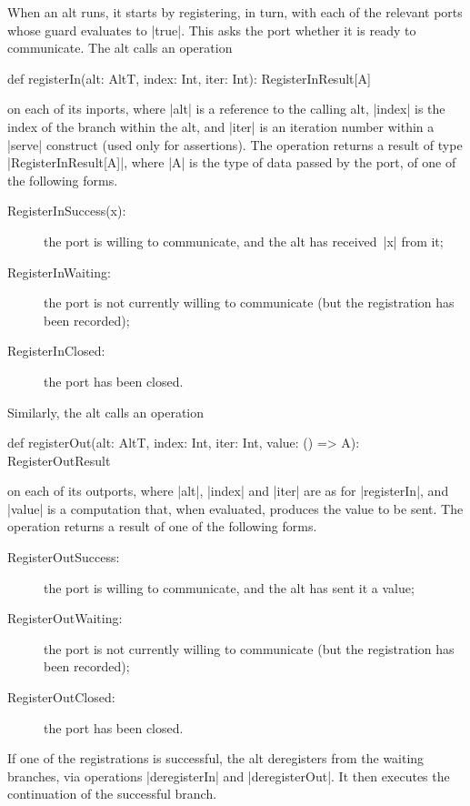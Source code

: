When an alt runs, it starts by registering, in turn, with each of the relevant
ports whose guard evaluates to |true|.  This asks the port whether it is ready
to communicate.  The alt calls an operation
%
\begin{scala}
def registerIn(alt: AltT, index: Int, iter: Int): RegisterInResult[A]  
\end{scala}
%
on each of its inports, where |alt| is a reference to the calling alt, |index|
is the index of the branch within the alt, and |iter| is an iteration number
within a |serve| construct (used only for assertions).  The operation returns a
result of type |RegisterInResult[A]|, where |A| is the type of data passed by
the port, of one of the following forms.
%
\begin{description}
\item[\rm{\scalastyle RegisterInSuccess(x)}:] the port is willing to
  communicate, and the alt has received~|x| from it;

\item[\rm{\scalastyle RegisterInWaiting}:] the port is not currently willing to
  communicate (but the registration has been recorded); 

\item[\rm{\scalastyle RegisterInClosed}:] the port has been closed.
\end{description}
%
Similarly, the alt calls an operation
%
\begin{scala}
def registerOut(alt: AltT, index: Int, iter: Int, value: () => A): RegisterOutResult
\end{scala}
on each of its outports, where |alt|, |index| and |iter| are as for
|registerIn|, and |value| is a computation that, when evaluated, produces the
value to be sent.  The operation returns a result of one of the following
forms.
%
\begin{description}
\item[\rm{\scalastyle RegisterOutSuccess}:] the port is willing to
  communicate, and the alt has sent it a value;

\item[\rm{\scalastyle RegisterOutWaiting}:] the port is not currently willing to
  communicate (but the registration has been recorded); 

\item[\rm{\scalastyle RegisterOutClosed}:] the port has been closed.
\end{description}

If one of the registrations is successful, the alt deregisters from the
waiting branches, via operations |deregisterIn| and |deregisterOut|.  It then
executes the continuation of the successful branch.  

